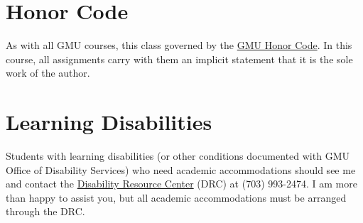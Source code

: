 \documentclass[11pt]{article}
\begin{document}

\section{Honor Code}\label{sec:honor-code}

As with all GMU courses, this class governed by the \href{http://oai.gmu.edu/the-mason-honor-code/}{GMU Honor Code}. In this course, all assignments carry with them an implicit statement that it is the sole work of the author.

\section{Learning Disabilities}


Students with learning disabilities (or other conditions documented with GMU Office of Disability Services) who need academic accommodations should see me and contact the \href{http://ods.gmu.edu/}{Disability Resource Center} (DRC) at (703) 993-2474. I am more than happy to assist you, but all academic accommodations must be arranged through the DRC.
\end{document}
